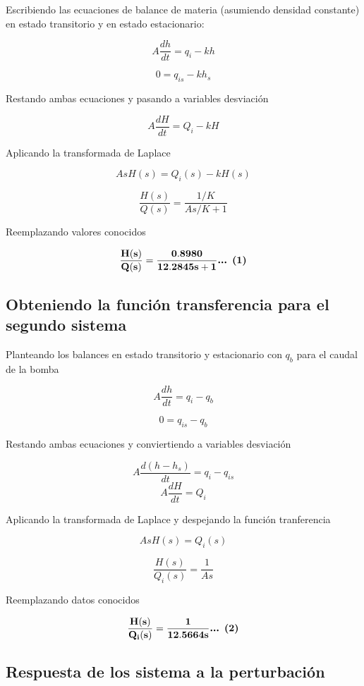 \documentclass[
  letterpaper,
  DIV=11,
  numbers=noendperiod]{scrreprt}
\begin{document}
Escribiendo las ecuaciones de balance de materia (asumiendo densidad
constante) en estado transitorio y en estado estacionario:

\[
A\frac{dh}{dt}= q_i-kh
\]

\[
0=q_{is}-kh_s
\]

Restando ambas ecuaciones y pasando a variables desviación

\[
A\frac{dH}{dt}=Q_i-kH
\]

Aplicando la transformada de Laplace

\[
AsH(s)=Q_i(s)-kH(s)
\]

\[
\frac{H(s)}{Q(s)}=\frac{1/K}{As/K+1}
\]

Reemplazando valores conocidos

\[
\mathbf{\frac{H(s)}{Q(s)}=\frac{0.8980}{12.2845s+1}}\space\space\space\space\textbf{... (1)}
\]

\hypertarget{obteniendo-la-funciuxf3n-transferencia-para-el-segundo-sistema}{%
\subsection{Obteniendo la función transferencia para el segundo
sistema}\label{obteniendo-la-funciuxf3n-transferencia-para-el-segundo-sistema}}

Planteando los balances en estado transitorio y estacionario con \(q_b\)
para el caudal de la bomba

\[
A\frac{dh}{dt}=q_i-q_b
\]

\[
0=q_{is}-q_b
\]

Restando ambas ecuaciones y conviertiendo a variables desviación

\[
A\frac{d(h-h_s)}{dt}=q_i-q_{is}
\] \[
A\frac{dH}{dt}=Q_i
\]

Aplicando la transformada de Laplace y despejando la función
tranferencia

\[
AsH(s)=Q_i(s)
\]

\[
\frac{H(s)}{Q_i(s)}=\frac{1}{As}
\]

Reemplazando datos conocidos

\[
\mathbf{\frac{H(s)}{Q_i(s)}=\frac{1}{12.5664s}} \space\space\space\space\textbf{... (2)}
\]

\hypertarget{respuesta-de-los-sistema-a-la-perturbaciuxf3n}{%
\subsection{Respuesta de los sistema a la
perturbación}\label{respuesta-de-los-sistema-a-la-perturbaciuxf3n}}
\end{document}
